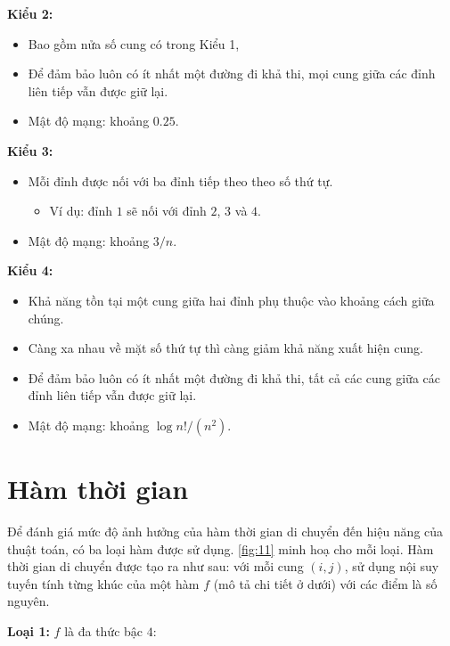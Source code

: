 \documentclass[../main.tex]{subfiles}
\begin{document}
\textbf{Kiểu 2:}

\begin{itemize}
\tightlist
\item
  Bao gồm nửa số cung có trong Kiểu 1,
\item
  Để đảm bảo luôn có ít nhất một đường đi khả thi, mọi cung giữa các
  đỉnh liên tiếp vẫn được giữ lại.
\item
  Mật độ mạng: khoảng \(0.25\).
\end{itemize}

\textbf{Kiểu 3:}

\begin{itemize}
\tightlist
\item
  Mỗi đỉnh được nối với ba đỉnh tiếp theo theo số thứ tự.

  \begin{itemize}
  \tightlist
  \item
    Ví dụ: đỉnh $1$ sẽ nối với đỉnh $2$, $3$ và $4$.
  \end{itemize}
\item
  Mật độ mạng: khoảng \(3/n\).
\end{itemize}

\textbf{Kiểu 4:}

\begin{itemize}
\tightlist
\item
  Khả năng tồn tại một cung giữa hai đỉnh phụ thuộc vào khoảng cách giữa
  chúng.
\item
  Càng xa nhau về mặt số thứ tự thì càng giảm khả năng xuất hiện cung.
\item
  Để đảm bảo luôn có ít nhất một đường đi khả thi, tất cả các cung giữa
  các đỉnh liên tiếp vẫn được giữ lại.
\item
  Mật độ mạng: khoảng \(\log n!/(n^2)\).
\end{itemize}

\section{Hàm thời gian}\label{huxe0m-thux1eddi-gian}

Để đánh giá mức độ ảnh hưởng của hàm thời gian di chuyển đến hiệu năng
của thuật toán, có ba loại hàm được sử dụng. \autoref{fig:11} minh hoạ cho mỗi
loại. Hàm thời gian di chuyển được tạo ra như sau: với mỗi cung
\((i,j)\), sử dụng nội suy tuyến tính từng khúc của một hàm \(f\) (mô tả
chi tiết ở dưới) với các điểm là số nguyên.

\textbf{Loại 1:} \(f\) là đa thức bậc $4$:
\end{document}
